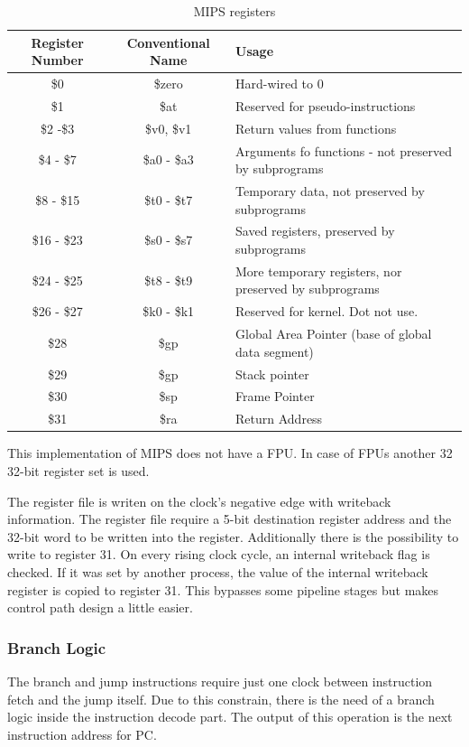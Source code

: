 \begin{table}[h!]
	\centering
	 \caption{MIPS registers}	
	\begin{tabular}{ccl}
		\toprule[2pt]
		\textbf{Register Number} & \textbf{Conventional Name} &\textbf{Usage}  \\
		\toprule[2pt]
		\$0 & \$zero & Hard-wired to 0 \\
		\$1 & \$at & Reserved for pseudo-instructions \\
		\$2 -\$3 & \$v0, \$v1 & Return values from functions \\
		\$4 - \$7 & \$a0 - \$a3 & Arguments fo functions - not preserved by subprograms \\
		\$8 - \$15 & \$t0 - \$t7 & Temporary data, not preserved by subprograms \\
		\$16 - \$23 & \$s0 - \$s7 & Saved registers, preserved by subprograms \\
		\$24 - \$25 & \$t8 - \$t9 & More temporary registers, nor preserved by subprograms  \\
		\$26 - \$27 & \$k0 - \$k1  & Reserved for kernel. Dot not use. \\
		\$28 & \$gp & Global Area Pointer (base of global data segment) \\
		\$29 & \$gp & Stack pointer \\
		\$30 & \$sp & Frame Pointer \\
		\$31 & \$ra & Return Address \\
		\bottomrule[2pt]
	\end{tabular} 
	\label{tab:mips registers}
\end{table}

This implementation of MIPS does not have a FPU. In case of FPUs another 32 32-bit register set is used.

The register file is writen on the clock's negative edge with writeback information. The register file require a 5-bit destination register address and the 32-bit word to be written into the register. Additionally there is the possibility to write to register 31. On every rising clock cycle, an internal writeback flag is checked. If it was set by another process, the value of the internal writeback register is copied to register 31. This bypasses some pipeline stages but makes control path design a little easier.
\subsubsection{Branch Logic}
The branch and jump instructions require just one clock between instruction fetch and the jump itself. Due to this constrain, there is the need of a branch logic inside
the instruction decode part. The output of this operation is the next instruction address for PC. 

